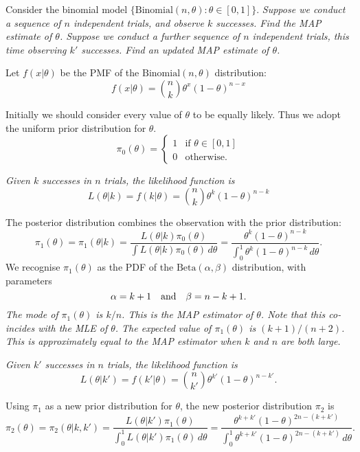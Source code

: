
\begin{example}
Consider the binomial model $\{\text{Binomial}(n,\theta):\theta\in[0,1]\}$. 
\ben
\it Suppose we conduct a sequence of $n$ independent trials, and observe $k$ successes. Find the MAP estimate of $\theta$.
\it Suppose we conduct a further sequence of $n$ independent trials, this time observing $k'$ successes. Find an updated MAP estimate of $\theta$.
\een
\end{example}

\begin{solution}
Let $f(x|\theta)$ be the PMF of the $\text{Binomial}(n,\theta)$ distribution:
\[
f(x|\theta) = \binom{n}{k}\theta^x(1-\theta)^{n-x}
\]

Initially we should consider every value of $\theta$ to be equally likely. Thus we adopt the uniform prior distribution for $\theta$.
\[
\pi_0(\theta) = \left\{\begin{array}{ll}
	1	& \text{if } \theta\in[0,1] \\
	0	& \text{otherwise.}
\end{array}\right.
\]


\ben
\it %
Given $k$ successes in $n$ trials, the likelihood function is
\[
L(\theta|k) = f(k|\theta) = \binom{n}{k}\theta^k(1-\theta)^{n-k}
\]

The posterior distribution combines the observation with the prior distribution:
\[
\pi_1(\theta) = \pi_1(\theta|k)	
	= \frac{L(\theta|k)\pi_0(\theta)}{\int L(\theta|k)\pi_0(\theta)\,d\theta}
	= \frac{\theta^k(1-\theta)^{n-k}}{\int_0^1\theta^k(1-\theta)^{n-k}\,d\theta}.
\]
\vspace*{2ex}
We recognise $\pi_1(\theta)$ as the PDF of the $\text{Beta}(\alpha,\beta)$ distribution, with parameters 
\[
\alpha=k+1 \text{\quad and\quad}\beta=n-k+1.
\]
\vspace*{-1ex}
\bit
\it The mode of $\pi_1(\theta)$ is $k/n$. This is the MAP estimator of $\theta$.
\it Note that this co-incides with the MLE of $\theta$.
\eit
\bit
\it The expected value of $\pi_1(\theta)$ is $(k+1)/(n+2)$.
\it This is approximately equal to the MAP estimator when $k$ and $n$ are both large.
\eit


\it %
Given $k'$ successes in $n$ trials, the likelihood function is
\[
L(\theta|k') = f(k'|\theta) = \binom{n}{k'}\theta^{k'}(1-\theta)^{n-k'}.
\]

Using $\pi_1$ as a new prior distribution for $\theta$, the new posterior distribution $\pi_2$ is
\[
\pi_2(\theta) = 
\pi_2(\theta|k,k')	
	= \frac{L(\theta|k')\pi_1(\theta)}{\int_0^1 L(\theta|k')\pi_1(\theta)\,d\theta} 
	= \frac{\theta^{k+k'}(1-\theta)^{2n-(k+k')}}{\int_0^1\theta^{k+k'}(1-\theta)^{2n-(k+k')}\,d\theta}.
\]


\end{solution}
